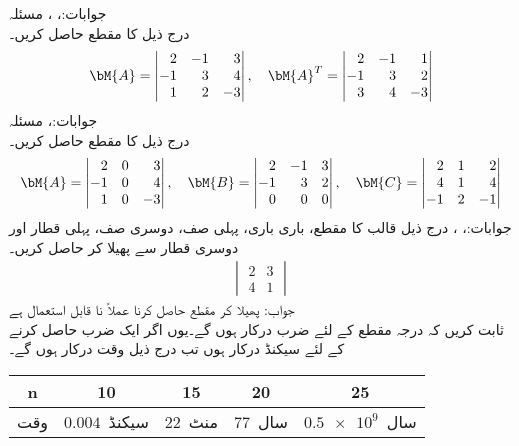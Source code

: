 جوابات:، ، 
\quad مسئلہ \\
درج ذیل کا مقطع حاصل کریں۔
\begin{align*}
\bM{A}=\begin{vmatrix*}[r] 2&-1&3\\-1&3&4\\1&2&-3 \end{vmatrix*}, \quad \bM{A}^T=\begin{vmatrix*}[r] 2&-1&1\\-1&3&2\\3&4&-3 \end{vmatrix*}
\end{align*}
جوابات:، 
\quad مسئلہ \\
درج ذیل کا مقطع حاصل کریں۔
\begin{align*}
\bM{A}=\begin{vmatrix*}[r] 2&0&3\\-1&0&4\\1&0&-3 \end{vmatrix*}, \quad \bM{B}=\begin{vmatrix*}[r] 2&-1&3\\-1&3&2\\0&0&0 \end{vmatrix*},\quad \bM{C}=\begin{vmatrix*}[r] 2&1&2\\4&1&4\\-1&2&-1 \end{vmatrix*}
\end{align*}
جوابات:، ، 
درج ذیل قالب کا مقطع، باری باری، پہلی صف، دوسری صف، پہلی قطار اور دوسری قطار سے پھیلا کر حاصل کریں۔
\begin{align*}
\begin{vmatrix}
2&3\\4&1
\end{vmatrix}
\end{align*}
جواب: 
\quad پھیلا کر مقطع حاصل کرنا عملاً نا قابل استعمال ہے\\
ثابت کریں کہ درجہ  مقطع کے لئے  ضرب درکار ہوں گے۔یوں اگر ایک ضرب حاصل کرنے کے لئے  سیکنڈ درکار ہوں تب درج ذیل وقت درکار ہوں گے۔
\begin{table}[h!]
\centering
\begin{tabular}{ccccc}
n&10&15&20&25\\
\hline
وقت& $0.004$\, سیکنڈ & $22$\, منٹ & $77$ \,سال & $\num{0.5e9}$ \,سال 
\end{tabular}
\end{table} 

